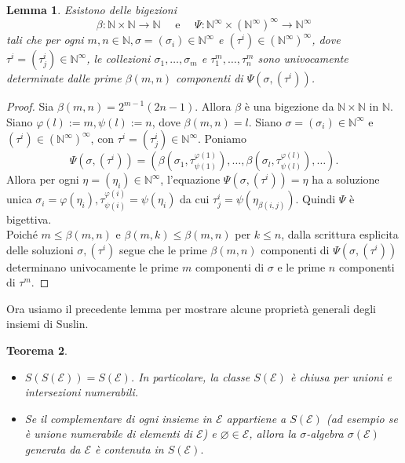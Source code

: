 \documentclass[a4paper, twoside]{article}
\newcommand{\<}{\langle}
\renewcommand{\>}{\rangle}
\newtheorem{teo}{Teorema}[]
\newtheorem{lemma}[teo]{Lemma}
\begin{document}
\begin{lemma}
	Esistono delle bigezioni
	$$	\beta: \mathbb{N} \times \mathbb{N} \rightarrow \mathbb{N} \quad \text { e } \quad \Psi: \mathbb{N}^{\infty} \times\left(\mathbb{N}^{\infty}\right)^{\infty} \rightarrow \mathbb{N}^{\infty}
	$$
	tali che per ogni $m, n \in \mathbb{N}, \sigma=\left(\sigma_{i}\right) \in \mathbb{N}^{\infty}$ e $\left(\tau^{i}\right) \in\left(\mathbb{N}^{\infty}\right)^{\infty}$, dove $\tau^{i}=\left(\tau_{j}^{i}\right) \in \mathbb{N}^{\infty}$, le collezioni $\sigma_{1}, \ldots, \sigma_{m}$ e $\tau_{1}^{m}, \ldots, \tau_{n}^{m}$ sono univocamente determinate dalle prime $\beta(m, n)$ componenti di $\Psi\left(\sigma,\left(\tau^{i}\right)\right)$.
\end{lemma}	

\begin{proof}
	Sia $\beta(m, n)=2^{m-1}(2 n-1)$. Allora $\beta$ è una bigezione da $\mathbb{N} \times \mathbb{N}$ in $\mathbb{N}$. Siano $\varphi(l):=m, \psi(l):=n$, dove $\beta(m, n)=l$. Siano $\sigma=\left(\sigma_{i}\right) \in \mathbb{N}^{\infty}$ e $\left(\tau^{i}\right) \in\left(\mathbb{N}^{\infty}\right)^{\infty}$, con $\tau^{i}=\left(\tau_{j}^{i}\right) \in \mathbb{N}^{\infty}$. Poniamo
	$$
	\Psi\left(\sigma,\left(\tau^{i}\right)\right)=\left(\beta\left(\sigma_{1}, \tau_{\psi(1)}^{\varphi(1)}\right), \ldots, \beta\left(\sigma_{l}, \tau_{\psi(l)}^{\varphi(l)}\right), \ldots\right) .
	$$
	Allora per ogni $\eta=\left(\eta_{i}\right) \in \mathbb{N}^{\infty}$, l'equazione $\Psi\left(\sigma,\left(\tau^{i}\right)\right)=\eta$ ha a soluzione unica $\sigma_{i}=\varphi\left(\eta_{i}\right),  \tau_{\psi(i)}^{\varphi(i)}=\psi(\eta_i)$ da cui $\tau_{j}^{i}=\psi\left(\eta_{\beta(i, j)}\right)$. Quindi $\Psi$ è bigettiva.\\
	Poiché $m \leq \beta(m, n)$ e $\beta(m, k) \leq \beta(m, n)$ per $k \leq n$, dalla scrittura esplicita delle soluzioni $\sigma, (\tau^i)$ segue che le prime $\beta(m, n)$ componenti di $\Psi\left(\sigma,\left(\tau^{i}\right)\right)$ determinano univocamente le prime $m$ componenti di $\sigma$ e le prime $n$ componenti di $\tau^{m}$.
\end{proof}

Ora usiamo il precedente lemma per mostrare alcune proprietà generali degli insiemi di Suslin.\\

\begin{teo} \label{SE}
	\hfill
	\begin{itemize}
		\item $S(S(\mathcal{E}))=S(\mathcal{E})$. In particolare, la classe $S(\mathcal{E})$ è chiusa per unioni e intersezioni numerabili.
		\item Se il complementare di ogni insieme in $\mathcal{E}$ appartiene a $S(\mathcal{E})$ (ad esempio se è unione numerabile di elementi di $\mathcal{E}$) e $\varnothing \in \mathcal{E}$, allora la $\sigma$-algebra $\sigma(\mathcal{E})$ generata da $\mathcal{E}$ è contenuta in $S(\mathcal{E}).$
	\end{itemize}
\end{teo}
\end{document}
